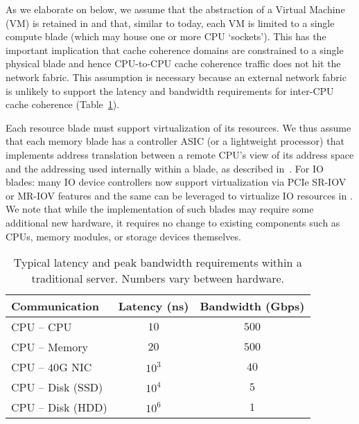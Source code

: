 As we elaborate on below, we assume that the abstraction of a Virtual Machine (VM) is retained in \dis and that, similar to today, each VM is limited to a single compute blade (which may house one or more CPU `sockets'). This has the important implication that cache coherence domains are constrained to 
a single physical blade and hence CPU-to-CPU cache coherence traffic does not hit the network fabric.
This assumption is necessary because an external network fabric is unlikely to support the latency and bandwidth requirements for inter-CPU cache coherence (Table~\ref{tab:tech}).


Each resource blade must support virtualization of its resources. 
We thus assume that each memory blade has a controller ASIC (or a lightweight processor) that implements address translation between a remote CPU's view of its address space and the addressing used internally within a blade, as described in~\cite{ddcHwDesign1}.
For IO blades: many IO device controllers now support virtualization via PCIe SR-IOV or MR-IOV features and the same can be leveraged to virtualize IO resources in \dis. 
We note that while the implementation of such blades may require some additional new hardware, it requires no change to existing components such as CPUs, memory modules, or storage devices themselves.



%
\begin{table}
  \centering
  \small
  \begin{tabular}{l|c|c}
		\textbf{Communication} & \textbf{Latency (ns)} & \textbf{Bandwidth (Gbps)}\\\hline
	\hline
    CPU -- CPU & $10$ & $500$\\\hline
    CPU -- Memory & $20$ & $500$\\\hline
    CPU -- $40$G NIC & $10^3$ & $40$\\\hline
    CPU -- Disk (SSD) & $10^4$ & $5$\\\hline
    CPU -- Disk (HDD) & $10^6$ & $1$\\\hline
    \hline
  \end{tabular}
  \vspace{0.1in}
  \caption{\small{Typical latency and peak bandwidth requirements within a traditional server. Numbers vary between hardware.}}
  \label{tab:tech}
\end{table}
%
\vspace{-0.1in}
